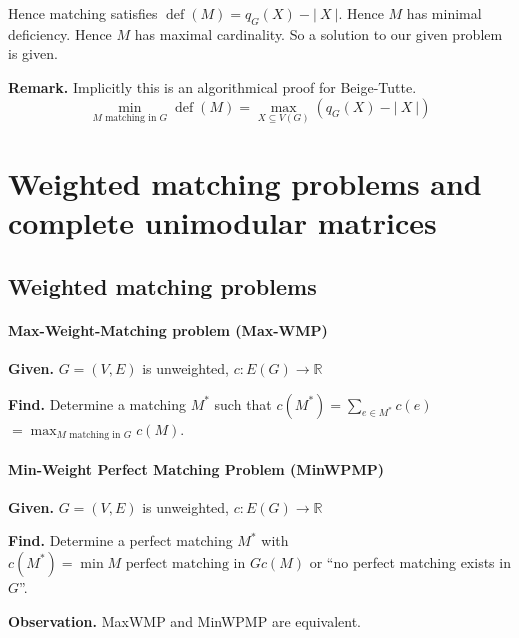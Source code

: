 \documentclass{article}
\newcommand{\card}[1]{\left|\:\!#1\:\!\right|}
\newcommand{\given}[1]{\textbf{Given.} #1\par}
\newcommand{\find}[1]{\textbf{Find.} #1\par}
\DeclareMathOperator{\deficiency}{def}
\begin{document}
Hence matching satisfies $\deficiency(M) = q_G(X) - \card{X}$.
Hence $M$ has minimal deficiency. Hence $M$ has maximal cardinality. So a solution to our given problem is given.

\textbf{Remark.}
  Implicitly this is an algorithmical proof for Beige-Tutte.
  \[
    \min_{M \text{ matching in } G} \deficiency(M) = \max_{X \subseteq V(G)} (q_G(X) - \card{X})
  \]

\section{Weighted matching problems and complete unimodular matrices}
\subsection{Weighted matching problems}
%
\paragraph{Max-Weight-Matching problem (Max-WMP)}
%
\given{$G = (V, E)$ is unweighted, $c: E(G) \rightarrow \mathbb{R}$}
\find{Determine a matching $M^*$ such that
  $c(M^*) = \sum_{e \in M^*} c(e)$
  $= \max_{M \text{ matching in } G} c(M)$.
}

\paragraph{Min-Weight Perfect Matching Problem (MinWPMP)}
%
\given{$G = (V, E)$ is unweighted, $c: E(G) \rightarrow \mathbb{R}$}
\find{Determine a perfect matching $M^*$ with
  $c(M^*) = \min{M \text{ perfect matching in } G} c(M)$
  or ``no perfect matching exists in $G$''.
}

\textbf{Observation.} MaxWMP and MinWPMP are equivalent.
\end{document}
